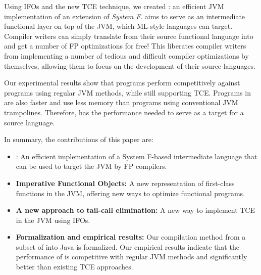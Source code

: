 Using IFOs and the new TCE technique, we created
\Name: an efficient JVM implementation of an extension of \emph{System
  F}. 
\name aims to serve as an intermediate functional layer on top
of the JVM, which ML-style languages can target. 
Compiler writers can simply translate from their source
functional language into \name and get a number of FP 
optimizations for free!  This liberates compiler
writers from implementing a number of tedious and difficult compiler
optimizations by themselves, allowing them to focus on the development
of their source languages.


Our experimental results show that \name programs perform
competitively against programs using regular JVM methods,
while still supporting TCE. Programs in \name are also
faster and use less memory than programs using conventional 
JVM trampolines. 
Therefore, \name has the performance needed to serve as a target for a 
source language.



In summary, the contributions of this paper are:

\begin{itemize}

\item \Name: An efficient implementation of a System F-based
  intermediate language that can be used to target the JVM by FP
  compilers.

\item {\bf Imperative Functional Objects:} A new representation of
  first-class functions in the JVM, offering new ways to
  optimize functional programs.

\item {\bf A new approach to tail-call elimination:} A new way to
  implement TCE in the JVM using IFOs. 

\item {\bf Formalization and empirical results:} Our compilation 
  method from a subset of \name into Java is formalized. Our empirical
  results indicate that the performance of \name is competitive with regular JVM methods 
  and significantly better than existing TCE approaches.

 

\end{itemize}
